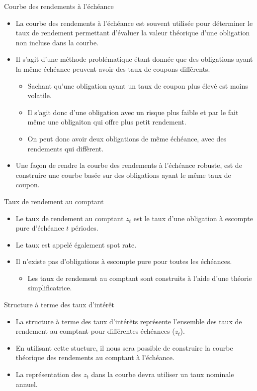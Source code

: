 \documentclass{beamer}
\begin{document}
\begin{frame}{Courbe des rendements à l’échéance}
\begin{itemize}
\item La courbe des rendements à l'échéance est souvent utilisée pour déterminer le taux de rendement permettant d’évaluer la valeur théorique d’une obligation non incluse dans la courbe. 
\item Il s'agit d'une méthode problématique étant donnée que des obligations ayant la même échéance peuvent avoir des taux de coupons différents.
\begin{itemize}
\item Sachant qu'une obligation ayant un taux de coupon plus élevé est moins volatile. 
\item Il s'agit donc d'une obligation avec un risque plus faible et par le fait même une obligaiton qui offre plus petit rendement.  
\item On peut donc avoir deux obligations de même échéance,  avec des rendements qui diffèrent.
\end{itemize}
\item Une  façon de rendre la courbe des rendements à l'échéance robuste,  est de construire une courbe basée sur des obligations ayant le même taux de coupon.
\end{itemize}
\end{frame}
\begin{frame}{Taux de rendement au comptant}
\begin{itemize}
\item Le taux de rendement au comptant $z_t$ est le taux d’une obligation à escompte pure d’échéance $t$ périodes. 
\item Le taux est appelé également spot rate.  
\item Il n’existe pas d’obligations à escompte pure pour toutes les échéances. 
\begin{itemize}
\item  Les taux de rendement au comptant sont construits à l’aide d’une théorie simplificatrice.\end{itemize} 
\end{itemize}
\end{frame}
\begin{frame}{Structure à terme des taux d’intérêt}
\begin{itemize}
\item La structure à terme des taux d'intérêts représente l'ensemble des taux de rendement au comptant pour différentes échéances ($z_t$). 
\item En utilisant cette stucture,  il nous sera possible de construire la courbe théorique des rendements au comptant à l’échéance. 
\item La représentation des $z_t$ dans la courbe devra utiliser un taux nominale annuel.
\end{itemize}
\end{frame}
\end{document}
